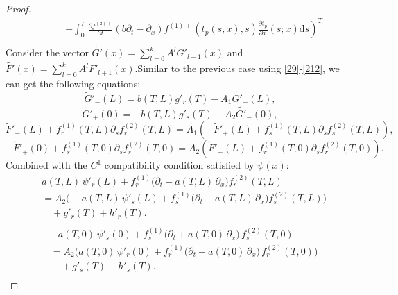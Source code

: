 \documentclass[a4paper,reqno,11pt]{amsart}
\numberwithin{equation}{section} %
\begin{document}
\begin{proof}
$$\begin{aligned}
& \quad  \quad\left.-\int_0^L{\frac{\partial f^{\left( 2 \right) +}}{\partial t}\left( b\partial _t-\partial _x \right) f^{\left( 1 \right) +}\left( t_p\left( s,x \right) ,s \right) \frac{\partial t_p}{\partial x}\left( s;x \right) \mathrm{d}s} \right) ^T\\
\end{aligned}
$$
Consider the vector $\tilde{G'}  (x) = \sum_{l=0}^k A^l G '_{l+1}(x)$ and  $\tilde{F'}  (x) = \sum_{l=0}^k A^l F '_{l+1}(x)$.Similar to the previous case using \eqref{29}-\eqref{212}, we can get the following equations:
$$
\tilde{G}'_-\left( L \right) =b\left( T,L \right) g'_r\left( T \right) -A_1\tilde{G'}_+\left( L \right) ,
$$
$$
\tilde{G}'_+\left( 0 \right) =-b\left( T,L \right) g'_s\left( T \right) -A_2\tilde{G'}_-\left( 0 \right) ,
$$
$$
\tilde{F}'_-\left( L \right) +f_{r}^{\left( 1 \right)}\left( T,L \right) \partial _sf_{r}^{\left( 2 \right)}\left( T,L \right) =A_1\left( -\tilde{F}'_+\left( L \right) +f_{s}^{\left( 1 \right)}\left( T,L \right) \partial _sf_{s}^{\left( 2 \right)}\left( T,L \right) \right) ,
$$
$$
-\tilde{F}'_+\left( 0 \right) +f_{s}^{\left( 1 \right)}\left( T,0 \right) \partial _sf_{s}^{\left( 2 \right)}\left( T,0 \right) =A_2\left( \tilde{F}'_-\left( L \right) +f_{r}^{\left( 1 \right)}\left( T,0 \right) \partial _sf_{r}^{\left( 2 \right)}\left( T,0 \right) \right) .
$$
Combined with the $C^1$ compatibility condition satisfied by $\psi (x)$:
$$
\begin{aligned}
	&a(T,L)\,\psi \prime _r(L)+f_{r}^{(1)}\bigl( \partial _t-a(T,L)\,\partial _x \bigr) f_{r}^{(2)}(T,L)\\
	&=A_2\bigl( -a(T,L)\,\psi \prime _s(L)+f_{s}^{(1)}\bigl( \partial _t+a(T,L)\,\partial _x \bigr) f_{s}^{(2)}(T,L) \bigr)\\
	&\quad +g\prime _r(T)+h\prime _r(T).\\
\end{aligned}
$$
$$
\begin{aligned}
	&-a(T,0)\,\psi \prime _s(0)+f_{s}^{(1)}\bigl( \partial _t+a(T,0)\,\partial _x \bigr) \,f_{s}^{(2)}(T,0)\\
	&=A_2\bigl( a(T,0)\,\psi \prime _r(0)+f_{r}^{(1)}\bigl( \partial _t-a(T,0)\,\partial _x \bigr) \,f_{r}^{(2)}(T,0) \bigr)\\
	&\quad +g\prime _s(T)+h\prime _s(T).\\
\end{aligned}
$$


\end{proof}
\end{document}
